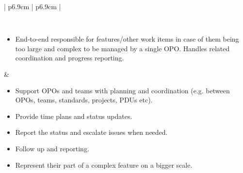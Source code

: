 \begin{table}[h]
\begin{tabularx}{\textwidth}{ | p{6.9cm} | p{6.9cm} | }
   \\ \hline
   
   \hline
      
   
   \\ \hline
   
   \begin{itemize}[label={}, leftmargin=*, topsep=0pt, itemsep=0pt, partopsep=0pt]
     \item End-to-end responsible for features/other work items in case of them being too large and complex to be managed by a single \ac{OPO}. Handles related coordination and progress reporting. 
   \end{itemize} & 

   \begin{itemize}[label={}, leftmargin=*, topsep=0pt, itemsep=0pt, partopsep=0pt]
     \item Support \acp{OPO} and teams with planning and coordination (e.g. between OPOs, teams, standards, projects, PDUs etc).
     \item Provide time plans and status updates.
     \item Report the status and escalate issues when needed.
     \item Follow up and reporting.
     \item Represent their part of a complex feature on a bigger scale.
   \end{itemize} 
   
   \\ \hline
   
   \end{tabularx}
\end{table}

